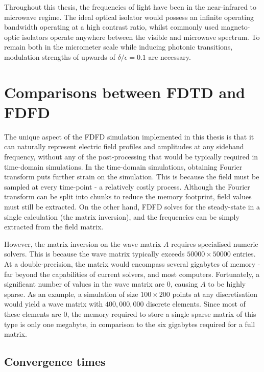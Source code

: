 Throughout this thesis, the frequencies of light have been in the near-infrared to microwave regime. The ideal optical isolator would possess an infinite operating bandwidth operating at a high contrast ratio, whilst commonly used magneto-optic isolators operate anywhere between the visible and microwave spectrum. To remain both in the micrometer scale while inducing photonic transitions, modulation strengths of upwards of $\delta / \epsilon = 0.1$ are necessary.

\section{Comparisons between FDTD and FDFD}

The unique aspect of the FDFD simulation implemented in this thesis is that it can naturally represent electric field profiles and amplitudes at any sideband frequency, without any of the post-processing that would be typically required in time-domain simulations. In the time-domain simulations, obtaining Fourier transform puts further strain on the simulation. This is because the field must be sampled at every time-point - a relatively costly process. Although the Fourier transform can be split into chunks to reduce the memory footprint, field values must still be extracted. On the other hand, FDFD solves for the steady-state in a single calculation (the matrix inversion), and the frequencies can be simply extracted from the field matrix. 

However, the matrix inversion on the wave matrix $A$ requires specialised numeric solvers. This is because the wave matrix typically exceeds $50 000 \times 50 000$ entries. At a double-precision, the matrix would encompass several gigabytes of memory - far beyond the capabilities of current solvers, and most computers. Fortunately, a significant number of values in the wave matrix are $0$, causing $A$ to be highly sparse. As an example, a simulation of size $100 \times 200$ points at any discretisation would yield a wave matrix with $400,000,000$ discrete elements. Since most of these elements are $0$, the memory required to store a single sparse matrix of this type is only one megabyte, in comparison to the six gigabytes required for a full matrix.

\subsection{Convergence times}

